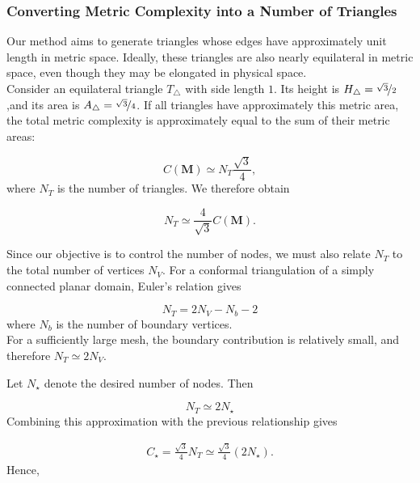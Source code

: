\documentclass[11pt,a4paper]{article}
\begin{document}
\subsubsection{Converting Metric Complexity into a Number of Triangles}

Our method aims to generate triangles whose edges have approximately unit length in metric space. Ideally, these triangles are also nearly equilateral in metric space, even though they may be elongated in physical space.\\

\noindent
Consider an equilateral triangle $T_\triangle$ with side length $1$. Its height is $H_\triangle=\nicefrac{\sqrt{3}}{2}$,and its area is $A_\triangle=\nicefrac{\sqrt{3}}{4}$. If all triangles have approximately this metric area, the total metric complexity is approximately equal to the sum of their metric areas:

\begin{equation}
C(\mathbf M)\simeq N_T\frac{\sqrt{3}}{4},
\end{equation}
\noindent
where $N_T$ is the number of triangles. We therefore obtain

\begin{equation}
\boxed{
N_T\simeq\frac{4}{\sqrt{3}}C(\mathbf M).
}
\end{equation}


\noindent
Since our objective is to control the number of nodes, we must also relate $N_T$ to the total number of vertices $N_V$. For a conformal triangulation of a simply connected planar domain, Euler's relation gives

\begin{equation*}
N_T=2N_V-N_b-2
\end{equation*}
\noindent
where $N_b$ is the number of boundary vertices.\\
\noindent
For a sufficiently large mesh, the boundary contribution is relatively small, and therefore $N_T\simeq 2N_V$.

\noindent
Let $N_\star$ denote the desired number of nodes. Then

\begin{equation}
N_T\simeq 2N_\star
\end{equation}
\noindent
Combining this approximation with the previous relationship gives

\begin{align*}
C_\star=\frac{\sqrt{3}}{4}N_T\simeq\frac{\sqrt{3}}{4}(2N_\star).
\end{align*}
\noindent
Hence,
\end{document}
